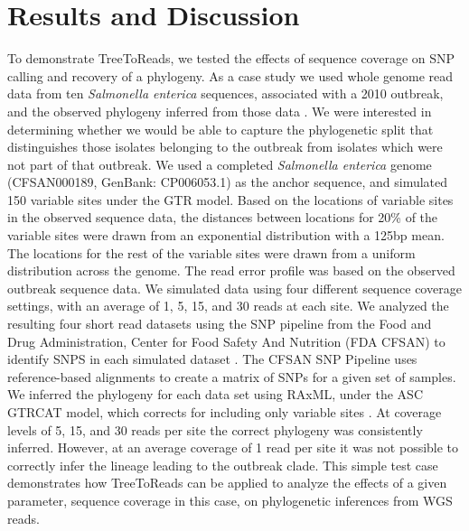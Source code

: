 \documentclass{bmcart}
\begin{document}
\section*{Results and Discussion}
To demonstrate TreeToReads, we tested the effects of sequence coverage on SNP calling and recovery of a phylogeny.
As a case study we used whole genome read data from ten \emph{Salmonella enterica} sequences,
associated with a 2010 outbreak, and the observed phylogeny inferred from those data \cite{hoffmann_tracing_2015}.
We were interested in determining whether we would be able to capture the phylogenetic split that distinguishes those isolates belonging to the outbreak from isolates which were not part of that outbreak.
We used a completed \emph{Salmonella enterica} genome (CFSAN000189, GenBank: CP006053.1) as the anchor sequence, and simulated 150 variable sites under the GTR model.
Based on the locations of variable sites in the observed sequence data, the distances between locations for 20\%  of the variable sites were drawn from an exponential distribution with a 125bp mean.
The locations for the rest of the variable sites were drawn from a uniform distribution across the genome. The read error profile was based on the observed outbreak sequence data.
We simulated data using four different sequence coverage settings, with an average of 1, 5, 15, and 30 reads at each site.
We analyzed the resulting four short read datasets using the SNP pipeline from the Food and Drug Administration, Center for Food Safety And Nutrition (FDA CFSAN) to identify SNPS in each simulated dataset \cite{davis_cfsan_2015}. 
The CFSAN SNP Pipeline uses reference-based alignments to create a matrix of SNPs for a given set of samples.
We inferred the phylogeny for each data set using RAxML, under the ASC GTRCAT model, which corrects for including only variable sites \cite{stamatakis_raxml_2014}.
At coverage levels of 5, 15, and 30 reads per site the correct phylogeny was consistently inferred.
However, at an average coverage of 1 read per site it was not possible to correctly infer the lineage leading to the outbreak clade.
This simple test case demonstrates how TreeToReads can be applied to analyze the effects of a given parameter, sequence coverage in this case, on phylogenetic inferences from WGS reads. 
\end{document}
